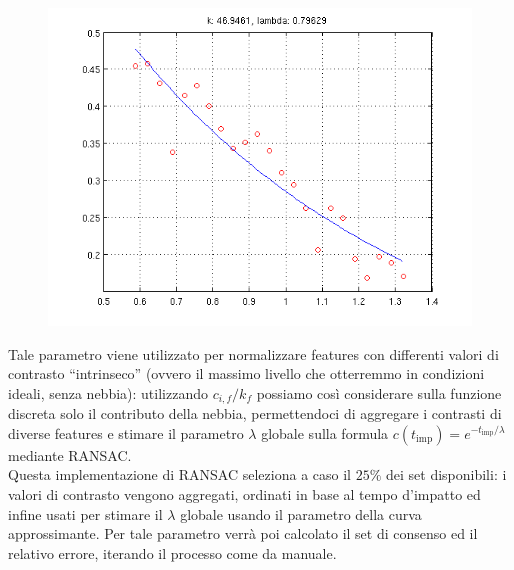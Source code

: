 \documentclass[12pt]{report}
\begin{document}
\begin{figure}[H]
	\centering
	\includegraphics[scale=0.6]{images/fitting.png}
	\label{fig:fitting}
\end{figure}

\noindent Tale parametro viene utilizzato per normalizzare features con differenti valori di contrasto ``intrinseco'' (ovvero il massimo livello che otterremmo in condizioni ideali, senza nebbia): utilizzando $c_{i,f}/k_f$ possiamo cos\`i considerare sulla funzione discreta solo il contributo della nebbia, permettendoci di aggregare i contrasti di diverse features e stimare il parametro $\lambda$ globale sulla formula $ c\left(t_{\text{imp}}\right) = e^{-t_{\text{imp}}/\lambda} $ mediante RANSAC.\\

\noindent Questa implementazione di RANSAC seleziona a caso il $25\%$ dei set disponibili: i valori di contrasto vengono aggregati, ordinati in base al tempo d'impatto ed infine usati per stimare il $\lambda$ globale usando il parametro della curva approssimante. Per tale parametro verr\`a poi calcolato il set di consenso ed il relativo errore, iterando il processo come da manuale.\\
\end{document}
